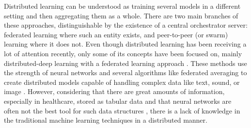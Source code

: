 Distributed learning \cite{distributed} can be understood as training several models in a different setting and then aggregating them as a whole. There are two main branches of these approaches, distinguishable by the existence of a central orchestrator server: federated learning where such an entity exists, and peer-to-peer (or swarm) \cite{swarm_learning} learning where it does not. 
Even though distributed learning has been receiving a lot of attention recently, only some of its concepts have been focused on, mainly distributed-deep learning with a federated learning approach \cite{xuFederatedLearningHealthcare2021,leeFederatedLearningClinical2020}. These methods use the strength of neural networks and several algorithms like federated averaging to create distributed models capable of handling complex data like text, sound, or image \cite{prayitnoSystematicReviewFederated2021}. However, considering that there are great amounts of information, especially in healthcare, stored as tabular data \cite{alvarezsanchezTAQIHToolTabular2019,dimartinoExplainableAIClinical2022,payrovnaziriExplainableArtificialIntelligence2020} and that neural networks are often not the best tool for such data structures \cite{borisovDeepNeuralNetworks2022a}, there is a lack of knowledge in the traditional machine learning techniques in a distributed manner.

